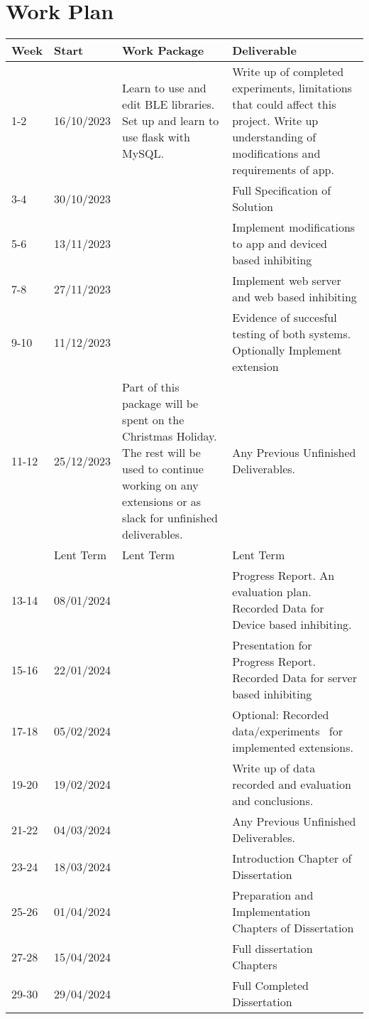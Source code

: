 \documentclass[12pt]{article}
\begin{document}
\section{Work Plan}
\begin{table}[!ht]
    \begin{tabular}{|p{1cm}|p{2cm}|p{6cm}|p{6cm}|}
    \hline
        Week & Start & Work Package & Deliverable \\ \hline
        1-2 & 16/10/2023 & Learn to use and edit BLE libraries. Set up and learn to use flask with MySQL. & Write up of completed experiments, limitations that could affect this project. Write up understanding of modifications and requirements of app. \\ \hline
        3-4 & 30/10/2023 & ~ & Full Specification of Solution \\ \hline
        5-6 & 13/11/2023 & ~ & Implement modifications to app and deviced based inhibiting \\ \hline
        7-8 & 27/11/2023 & ~ & Implement web server and web based inhibiting \\ \hline
        9-10 & 11/12/2023 & ~ & Evidence of succesful testing of both systems. Optionally Implement extension \\ \hline
        11-12 & 25/12/2023 & Part of this package will be spent on the Christmas Holiday. The rest will be used to continue working on any extensions or as slack for unfinished deliverables. & Any Previous Unfinished Deliverables. \\ \hline
        & Lent Term & Lent Term & Lent Term \\ \hline
        13-14 & 08/01/2024 & ~ & Progress Report. An evaluation plan. Recorded Data for Device based inhibiting. \\ \hline
        15-16 & 22/01/2024 & ~ & Presentation for Progress Report.   Recorded Data for server based inhibiting \\ \hline
        17-18 & 05/02/2024 & ~ & Optional: Recorded data/experiments  for implemented extensions. \\ \hline
        19-20 & 19/02/2024 & ~ & Write up of data recorded and evaluation and conclusions. \\ \hline
        21-22 & 04/03/2024 & ~ & Any Previous Unfinished Deliverables. \\ \hline
        23-24 & 18/03/2024 & ~ & Introduction Chapter of Dissertation \\ \hline
        25-26 & 01/04/2024 & ~ & Preparation and Implementation Chapters of Dissertation \\ \hline
        27-28 & 15/04/2024 & ~ & Full dissertation Chapters \\ \hline
        29-30 & 29/04/2024 & ~ & Full Completed Dissertation \\ \hline
    \end{tabular}
\end{table}
\end{document}

